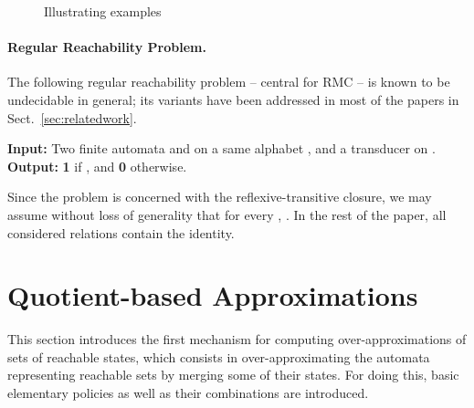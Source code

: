 \documentclass[]{llncs}
\begin{document}
\begin{figure}[tb]
\begin{minipage}{0.3\textwidth}
{
}
\end{minipage}
\begin{minipage}{0.3\textwidth}
\centering
{}
\end{minipage}
\vspace{-1em}
\caption{Illustrating examples}\label{fig:def}
\end{figure}


\paragraph*{Regular Reachability Problem.}
The following regular reachability problem -- central for RMC -- is known to be undecidable in general; its variants have
been addressed in most of the papers in Sect.~\ref{sec:relatedwork}. \smallskip

\noindent
{\bf Input:} Two finite automata  and  on a same alphabet , 
and a transducer  on .\\
{\bf Output:} {\bf 1} if , and {\bf 0}
otherwise. 
\smallskip

 


Since the problem is concerned with the reflexive-transitive closure, we may
assume without loss of generality that for every ,
. In the rest of the paper, all considered relations contain the
identity.




\section{Quotient-based Approximations}
\label{quotient-based-approximations}

This section introduces the first mechanism for computing
over-approximations of sets of reachable states, which consists in
over-approximating the automata representing reachable sets by merging
some of their states. For doing this, basic elementary policies as
well as their combinations are introduced.
  
\end{document}
